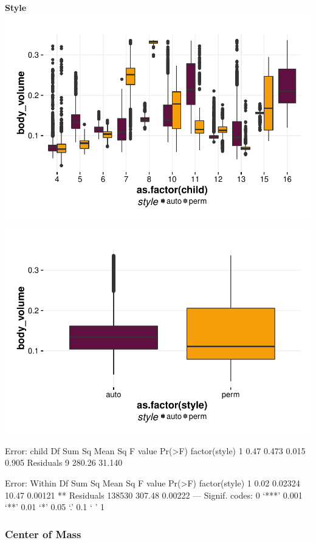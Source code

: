 \documentclass{article}
\begin{document}
\textbf{Style}
\includegraphics{features-plot_body_volume_child_style_quiz}

\includegraphics{features-plot_body_volume_style_quiz}

\begin{Schunk}
\begin{Soutput}
Error: child
              Df Sum Sq Mean Sq F value Pr(>F)
factor(style)  1   0.47   0.473   0.015  0.905
Residuals      9 280.26  31.140               

Error: Within
                  Df Sum Sq Mean Sq F value  Pr(>F)   
factor(style)      1   0.02 0.02324   10.47 0.00121 **
Residuals     138530 307.48 0.00222                   
---
Signif. codes:  0 ‘***’ 0.001 ‘**’ 0.01 ‘*’ 0.05 ‘.’ 0.1 ‘ ’ 1
\end{Soutput}
\end{Schunk}

\subsubsection{Center of Mass}
\end{document}
